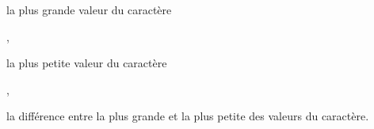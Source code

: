 \begin{alterqcm}[lq=10cm]
  {%
   {\begin{minipage}[t]{6cm} la plus grande valeur du caractère \end{minipage}},
   {\begin{minipage}[t]{6cm}la plus petite valeur du caractère 
    \end{minipage}},
   {\begin{minipage}[t]{6cm} la différence entre la plus grande et la plus petite des valeurs du caractère.
    \end{minipage}}
 }

\end{alterqcm}



\ifdefined\COMPLETE
\else
    
\fi
